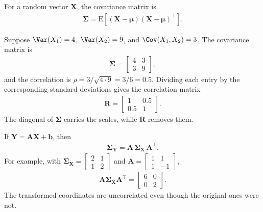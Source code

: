 \documentclass[a4paper, 12pt]{book}
\begin{document}
\begin{definition}
    For a random vector $\mathbf{X}$, the covariance matrix is
\begin{align}
    \boldsymbol{\Sigma} = \mathrm{E}[(\mathbf{X}-\boldsymbol{\mu})(\mathbf{X}-\boldsymbol{\mu})^\top].
\end{align}
\end{definition}
\begin{example}
    Suppose $\Var(X_1)=4$, $\Var(X_2)=9$, and $\Cov(X_1,X_2)=3$. The covariance
    matrix is
    \begin{align}
        \boldsymbol{\Sigma} =
        \begin{bmatrix}4&3\\3&9\end{bmatrix},
    \end{align}
    and the correlation is $\rho=3/\sqrt{4\cdot9}=3/6=0.5$. Dividing each entry
    by the corresponding standard deviations gives the correlation matrix
    \begin{align}
        \mathbf{R} =
        \begin{bmatrix}1&0.5\\0.5&1\end{bmatrix}.
    \end{align}
    The diagonal of $\boldsymbol{\Sigma}$ carries the scales, while $\mathbf{R}$
    removes them.
\end{example}

\begin{example}
    If $\mathbf{Y}=\mathbf{A}\mathbf{X}+\mathbf{b}$, then
    \begin{align}
        \boldsymbol{\Sigma}_{\mathbf{Y}}
        = \mathbf{A}\,\boldsymbol{\Sigma}_{\mathbf{X}}\,\mathbf{A}^\top.
    \end{align}
    For example, with
    $\boldsymbol{\Sigma}_{\mathbf{X}}=\begin{bmatrix}2&1\\1&2\end{bmatrix}$
    and $\mathbf{A}=\begin{bmatrix}1&1\\1&-1\end{bmatrix}$,
    \begin{align}
        \mathbf{A}\boldsymbol{\Sigma}_{\mathbf{X}}\mathbf{A}^\top
        = \begin{bmatrix}6&0\\0&2\end{bmatrix}.
    \end{align}
    The transformed coordinates are uncorrelated even though the original ones
    were not.
\end{example}
\end{document}
